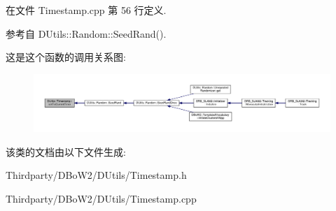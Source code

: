 在文件 Timestamp.\-cpp 第 56 行定义.



参考自 D\-Utils\-::\-Random\-::\-Seed\-Rand().



这是这个函数的调用关系图\-:
\nopagebreak
\begin{figure}[H]
\begin{center}
\leavevmode
\includegraphics[width=350pt]{classDUtils_1_1Timestamp_ae27c920f3833c104096213c6fb17f4d8_icgraph}
\end{center}
\end{figure}




该类的文档由以下文件生成\-:\begin{DoxyCompactItemize}
\item 
Thirdparty/\-D\-Bo\-W2/\-D\-Utils/Timestamp.\-h\item 
Thirdparty/\-D\-Bo\-W2/\-D\-Utils/Timestamp.\-cpp\end{DoxyCompactItemize}
